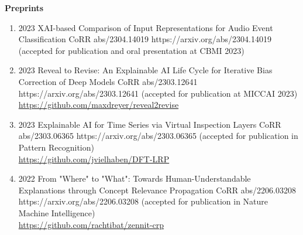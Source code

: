 \headedsection %
{\bf Preprints}{}
{
    \begin{enumerate}

        \item {}
                        {2023}
                        {XAI-based Comparison of Input Representations for Audio Event Classification}
                        {CoRR abs/2304.14019}
                        {https://arxiv.org/abs/2304.14019}
                        {(accepted for publication and oral presentation at CBMI 2023)}
                
        \item {}
                        {2023}
                        {Reveal to Revise: An Explainable AI Life Cycle for Iterative Bias Correction of Deep Models}
                        {CoRR abs/2303.12641}
                        {https://arxiv.org/abs/2303.12641}
                        {(accepted for publication at MICCAI 2023)\\ \href{https://github.com/maxdreyer/reveal2revise}{https://github.com/maxdreyer/reveal2revise}}
        
        \item {}
                        {2023}
                        {Explainable AI for Time Series via Virtual Inspection Layers}
                        {CoRR abs/2303.06365}
                        {https://arxiv.org/abs/2303.06365}
                        {(accepted for publication in Pattern Recognition)\\ \href{https://github.com/jvielhaben/DFT-LRP}{https://github.com/jvielhaben/DFT-LRP}}

        \item {}
                        {2022}
                        {From "Where" to "What": Towards Human-Understandable Explanations through Concept Relevance Propagation}
                        {CoRR abs/2206.03208}
                        {https://arxiv.org/abs/2206.03208}
                        {(accepted for publication in Nature Machine Intelligence)\\ \href{https://github.com/rachtibat/zennit-crp}{https://github.com/rachtibat/zennit-crp}}


\end{enumerate}}

